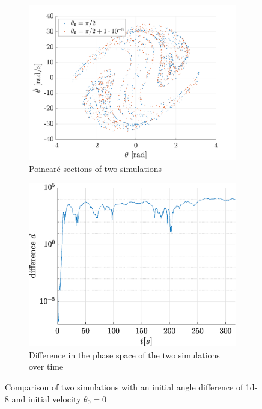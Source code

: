 \documentclass[a4paper,12pt,twoside]{article}
\begin{document}
\begin{figure}[h!]
\centering
\begin{subfigure}[t]{0.49\textwidth}
	\includegraphics[width=\textwidth]{graphs/f_sens.png}
	\caption{Poincaré sections of two simulations}
	\label{fig:f-senspcr}
\end{subfigure}
\begin{subfigure}[t]{0.45\textwidth}
	\includegraphics[width=\textwidth]{graphs/f_lyap.eps}
	\caption{Difference in the phase space of the two simulations over time}
	\label{fig:f-lyap}
\end{subfigure}
\caption{Comparison of two simulations with an initial angle difference of \num{1d-8} and initial velocity $\theta_0 = 0$}
\label{fig:f-sens}
\end{figure}
\end{document}
